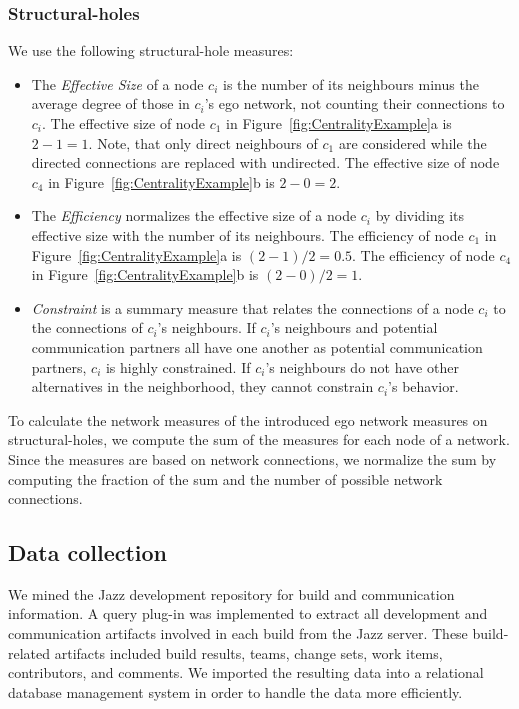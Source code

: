 
\subsubsection{Structural-holes}
We use the following structural-hole measures:
\begin{itemize}
  \item The \emph{Effective Size} of a node $c_i$ is the number of its
  neighbours minus the average degree of those in $c_i$'s ego network, not
  counting their connections to $c_i$. The effective size of node $c_1$ in 
  Figure~\ref{fig:CentralityExample}a is $2-1=1$. Note, that only direct
  neighbours of $c_1$ are considered while the directed connections are replaced
  with undirected. The effective size of node $c_4$ in 
  Figure~\ref{fig:CentralityExample}b is $2-0=2$.
  
  \item The \emph{Efficiency} normalizes the effective size of a node $c_i$ by
  dividing its effective size with the number of its neighbours. The
  efficiency of node $c_1$ in Figure~\ref{fig:CentralityExample}a is
  $(2-1)/2=0.5$. The efficiency of node $c_4$ in
  Figure~\ref{fig:CentralityExample}b is $(2-0)/2=1$.
  
  \item \emph{Constraint} is a summary measure that relates the connections of a
  node $c_i$ to the connections of $c_i$'s neighbours. If $c_i$'s neighbours and
  potential communication partners all have one another as potential communication
  partners, $c_i$ is highly constrained. If $c_i$'s neighbours do not have other
  alternatives in the neighborhood, they cannot constrain $c_i$'s behavior. 
\end{itemize}

To calculate the network measures of the introduced ego network measures on
structural-holes, we compute the sum of the measures for each node of a network.
Since the measures are based on network connections, we normalize the sum by
computing the fraction of the sum and the number of possible network connections.

\subsection{Data collection} 
We mined the Jazz development repository for build and communication information.
A query plug-in was implemented to extract all development and communication
artifacts involved in each build from the Jazz server. These build-related
artifacts included build results, teams, change sets, work items, contributors,
and comments. We imported the resulting data into a relational database
management system in order to handle the data more efficiently.

